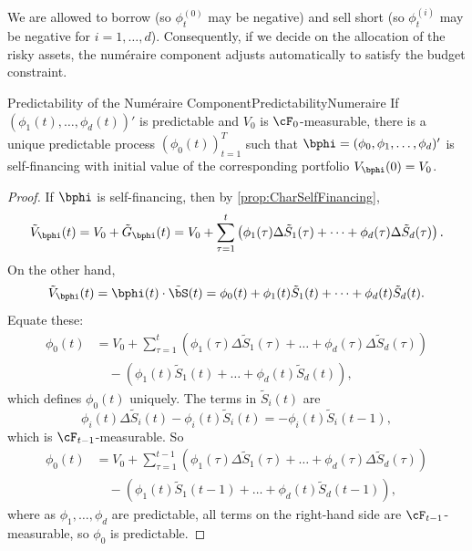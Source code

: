 We are allowed to borrow (so \(\phi_t^{(0)}\) may be negative) and sell short (so \(\phi_t^{(i)}\) may be negative for \(i = 1, \dots, d\)). Consequently, if we decide on the allocation of the risky assets, the num\'{e}raire component adjusts automatically to satisfy the budget constraint.

\begin{prop}{Predictability of the Num\'{e}raire Component}{PredictabilityNumeraire}
	If \((\phi_1(t), \dots, \phi_d(t))'\) is predictable and \(V_0\) is \(\cF_0\)-measurable, there is a unique predictable process \((\phi_0(t))_{t=1}^T\) such that \(\bphi = (\phi_0, \phi_1, \dots, \phi_d)'\) is self-financing with initial value of the corresponding portfolio \(V_{\bphi}(0) = V_0\).
\end{prop}

\begin{proof}
	If \(\bphi\) is self-financing, then by \cref{prop:CharSelfFinancing},
	\begin{equation*}
		\tilde{V}_{\bphi}(t) = V_0 + \tilde{G}_{\bphi}(t) = V_0 + \sum_{\tau=1}^t \left( \phi_1(\tau) \Delta \tilde{S}_1(\tau) + \dots + \phi_d(\tau) \Delta \tilde{S}_d(\tau) \right).
	\end{equation*}
	On the other hand,
	\begin{equation*}
		\tilde{V}_{\bphi}(t) = \bphi(t) \cdot \tilde{\bS}(t) = \phi_0(t) + \phi_1(t) \tilde{S}_1(t) + \dots + \phi_d(t) \tilde{S}_d(t).
	\end{equation*}
	Equate these:
	\begin{align*}
		\phi_0(t) & = V_0 + \sum_{\tau=1}^t \left( \phi_1(\tau) \Delta \tilde{S}_1(\tau) + \dots + \phi_d(\tau) \Delta \tilde{S}_d(\tau) \right) \\
		          & \quad - \left( \phi_1(t) \tilde{S}_1(t) + \dots + \phi_d(t) \tilde{S}_d(t) \right),
	\end{align*}
	which defines \(\phi_0(t)\) uniquely. The terms in \(\tilde{S}_i(t)\) are
	\begin{equation*}
		\phi_i(t) \Delta \tilde{S}_i(t) - \phi_i(t) \tilde{S}_i(t) = -\phi_i(t) \tilde{S}_i(t-1),
	\end{equation*}
	which is \(\cF_{t-1}\)-measurable. So
	\begin{align*}
		\phi_0(t) & = V_0 + \sum_{\tau=1}^{t-1} \left( \phi_1(\tau) \Delta \tilde{S}_1(\tau) + \dots + \phi_d(\tau) \Delta \tilde{S}_d(\tau) \right) \\
		          & \quad - \left( \phi_1(t) \tilde{S}_1(t-1) + \dots + \phi_d(t) \tilde{S}_d(t-1) \right),
	\end{align*}
	where as \(\phi_1, \dots, \phi_d\) are predictable, all terms on the right-hand side are \(\cF_{t-1}\)-measurable, so \(\phi_0\) is predictable.
\end{proof}

